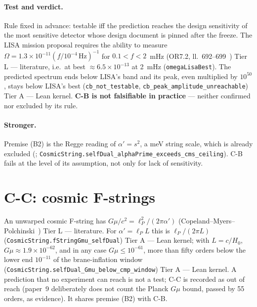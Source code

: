 \documentclass[11pt,a4paper]{article}
\theoremstyle{remark}
\newcommand{\tierA}{\colorbox{green!15}{\textsf{\scriptsize Tier A --- Lean kernel}}}
\newcommand{\tierL}{\colorbox{blue!10}{\textsf{\scriptsize Tier L --- literature}}}
\newcommand{\lean}[1]{\texttt{#1}}
\begin{document}
\paragraph{Test and verdict.} Rule fixed in advance: testable iff the prediction reaches the design sensitivity of
the most sensitive detector whose design document is pinned after the freeze. The LISA mission proposal requires
the ability to measure $\Omega=1.3\times10^{-11}(f/10^{-4}\,\mathrm{Hz})^{-1}$ for $0.1<f<2$~mHz (OR7.2,
ll.~692--699~\cite{LISA2017}) \tierL, i.e.\ at best $\approx6.5\times10^{-13}$ at 2~mHz (\lean{omegaLisaBest}). The
predicted spectrum ends below LISA's band and its peak, even multiplied by $10^{50}$, stays below LISA's best
(\lean{cb\_not\_testable}, \lean{cb\_peak\_amplitude\_unreachable}) \tierA. \textbf{C-B is not falsifiable in
practice} --- neither confirmed nor excluded by its rule.

\paragraph{Stronger.} Premise (B2) is the Regge reading of $\alpha'=s^2$, a meV string scale, which is already
excluded (; \lean{CosmicString.selfDual\_alphaPrime\_exceeds\_cms\_ceiling}). C-B fails at the
level of its assumption, not only for lack of sensitivity.

\section{C-C: cosmic F-strings}
\label{sec:cc}

An unwarped cosmic F-string has $G\mu/c^2=\ell_P^2/(2\pi\alpha')$ (Copeland--Myers--Polchinski~\cite{CMP2004})
\tierL. For $\alpha'=\ell_P L$ this is $\ell_P/(2\pi L)$ (\lean{CosmicString.fStringGmu\_selfDual}) \tierA; with
$L=c/H_0$, $G\mu\approx1.9\times10^{-62}$, and in any case $G\mu\le10^{-61}$, more than fifty orders below the lower
end $10^{-11}$ of the brane-inflation window (\lean{CosmicString.selfDual\_Gmu\_below\_cmp\_window}) \tierA. A
prediction that no experiment can reach is not a test; C-C is recorded as out of reach (paper~9 deliberately does
not count the Planck $G\mu$ bound, passed by 55 orders, as evidence). It shares premise (B2) with C-B.

\end{document}
